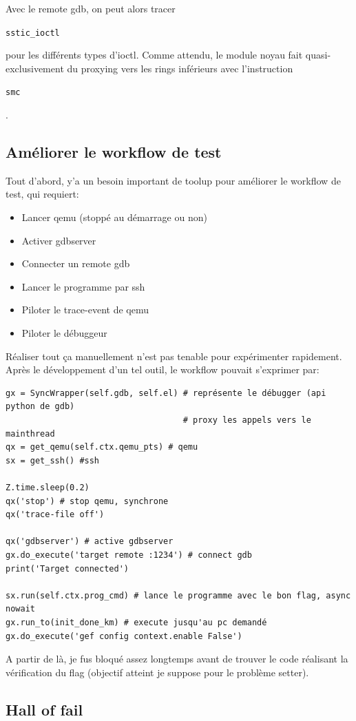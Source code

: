 \documentclass[14pt]{article}
\newcommand{\inlinebox}[2]{%
\colorbox{bg}{%
\parbox[b][0.6em]{\widthof{\texttt{#2}}}{\texttt{#2}}
}
}
\newcommand{\inlinebash}[1]{ \inlinebox{bash}{#1} }
\newcommand{\inlinec}[1]{ \inlinebox{c}{#1} }
\theoremstyle{definition}
\begin{document}
Avec le remote gdb, on peut alors tracer \inlinec{sstic_ioctl} pour les différents types d'ioctl.
Comme attendu, le module noyau fait quasi-exclusivement du proxying vers les rings inférieurs avec l'instruction \inlinebash{smc}.

\subsection{Améliorer le workflow de test}
Tout d'abord, y'a un besoin important de toolup pour améliorer le workflow de test, qui requiert:
\begin{itemize}
  \item Lancer qemu (stoppé au démarrage ou non)
  \item Activer gdbserver
  \item Connecter un remote gdb
  \item Lancer le programme par ssh
  \item Piloter le trace-event de qemu
  \item Piloter le débuggeur
\end{itemize}

Réaliser tout ça manuellement n'est pas tenable pour expérimenter rapidement. Après le développement d'un tel outil, le workflow pouvait s'exprimer par:

\begin{verbatim}
gx = SyncWrapper(self.gdb, self.el) # représente le débugger (api python de gdb)
                                    # proxy les appels vers le mainthread
qx = get_qemu(self.ctx.qemu_pts) # qemu
sx = get_ssh() #ssh

Z.time.sleep(0.2)
qx('stop') # stop qemu, synchrone
qx('trace-file off')

qx('gdbserver') # active gdbserver
gx.do_execute('target remote :1234') # connect gdb
print('Target connected')

sx.run(self.ctx.prog_cmd) # lance le programme avec le bon flag, async nowait
gx.run_to(init_done_km) # execute jusqu'au pc demandé
gx.do_execute('gef config context.enable False')
\end{verbatim}

A partir de là, je fus bloqué assez longtemps avant de trouver le code réalisant la vérification du flag (objectif atteint je suppose pour le problème setter).

\subsection{Hall of fail}
\end{document}
